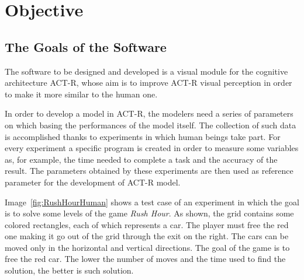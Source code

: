 \chapter{Objective}

	\section{The Goals of the Software}
	The software to be designed and developed is a visual module for the cognitive architecture ACT-R, whose aim is to improve ACT-R visual perception in order to make it more similar to the human one. 
	
	In order to develop a model in ACT-R, the modelers need a series of parameters on which basing the performances of the model itself.
	The collection of such data is accomplished thanks to experiments in which human beings take part. 
	For every experiment a specific program is created in order to measure some variables as, for example, the time needed to complete a task and the accuracy of the result.
	The parameters obtained by these experiments are then used as reference parameter for the development of ACT-R model.

 
	Image~\ref{fig:RushHourHuman} shows a test case of an experiment in which the goal is to solve some levels of the game \emph{Rush Hour}. As shown, the grid contains some colored rectangles, each of which represents a car. The player must free the red one making it go out of the grid through the exit on the right. The cars can be moved only in the horizontal and vertical directions. The goal of the game is to free the red car. The lower the number of moves and the time used to find the solution, the better is such solution.

